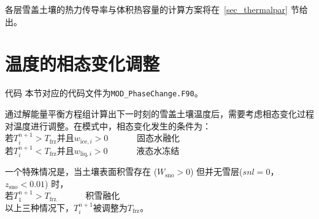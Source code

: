 各层雪盖土壤的热力传导率与体积热容量的计算方案将在~\ref{sec_thermalpar} 节给出。


\section{温度的相态变化调整}\label{sec:温度的相态变化调整}

\begin{mymdframed}{代码}
  本节对应的代码文件为\texttt{MOD\_PhaseChange.F90}。
\end{mymdframed}

通过解能量平衡方程组计算出下一时刻的雪盖土壤温度后，需要考虑相态变化过程对温度进行调整。在模式中，相态变化发生的条件为：\\
若$T_i^{n+1}>T_{\mathrm {frz}} $并且$w_{\mathrm{ice},i}>0$ \ \   \ \  \ \   固态水融化\\
若$T_i^{n+1}<T_{\mathrm {frz}} $并且$w_{\mathrm{liq},i}>0$  \ \   \ \  \ \         液态水冻结

一个特殊情况是，当土壤表面积雪存在 ($W_{\mathrm{sno}}>0$) 但并无雪层($snl=0$，$z_{\mathrm{sno}}<0.01$) 时，\\
若$T_1^{n+1}>T_{\mathrm {frz}} $      \ \   \ \  \ \                 积雪融化\\
%
以上三种情况下，$T_i^{n+1}$被调整为$T_{\mathrm {frz}} $。


